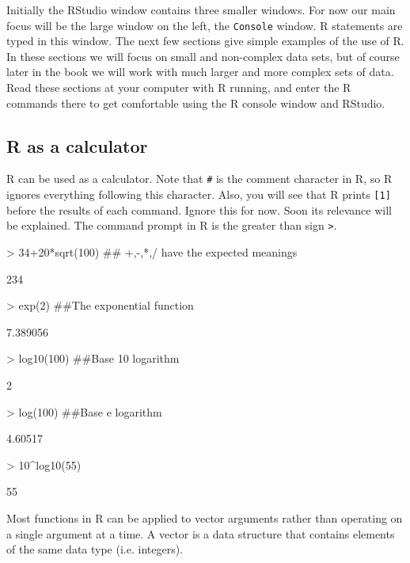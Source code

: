 Initially the RStudio window contains three smaller windows. For now our main focus will be the large window on the left, the \verb+Console+ window. R statements are typed in this window. The next few sections give simple examples of the use of R. In these sections we will focus on small and non-complex data sets, but of course later in the book we will work with much larger and more complex sets of data.  Read these sections at your computer with R running, and enter the R commands there to get comfortable using the R console window and RStudio.

\subsection{R as a calculator}
R can be used as a calculator. Note that \verb+#+ is the comment character in R, so R ignores everything following this character. Also, you will see that R prints \texttt{[1]} before the results of each command. Ignore this for now. Soon its relevance will be explained. The command prompt  in R is the greater than sign \verb+>+. 
\begin{Schunk}
\begin{Sinput}
> 34+20*sqrt(100)  ## +,-,*,/ have the expected meanings
\end{Sinput}
\begin{Soutput}
[1] 234
\end{Soutput}
\begin{Sinput}
> exp(2)  ##The exponential function
\end{Sinput}
\begin{Soutput}
[1] 7.389056
\end{Soutput}
\begin{Sinput}
> log10(100)  ##Base 10 logarithm
\end{Sinput}
\begin{Soutput}
[1] 2
\end{Soutput}
\begin{Sinput}
> log(100)  ##Base e logarithm
\end{Sinput}
\begin{Soutput}
[1] 4.60517
\end{Soutput}
\begin{Sinput}
> 10^log10(55)
\end{Sinput}
\begin{Soutput}
[1] 55
\end{Soutput}
\end{Schunk}

Most functions in R can be applied to vector arguments rather than operating on a single argument at a time. A vector is a data structure that contains elements of the same data type (i.e. integers).

